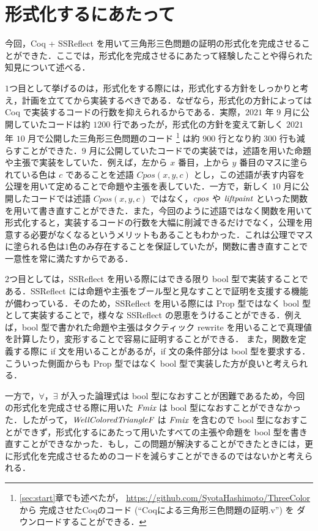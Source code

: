 \section{形式化するにあたって}
今回，Coq + SSReflect を用いて三角形三色問題の証明の形式化を完成させることができた．ここでは，形式化を完成させるにあたって経験したことや得られた知見について述べる．

$1$つ目として挙げるのは，形式化をする際には，形式化する方針をしっかりと考え，計画を立ててから実装するべきである．なぜなら，形式化の方針によっては Coq で実装するコードの行数を抑えられるからである．実際，$2021$ 年 $9$ 月に公開していたコードは約 $1200$ 行であったが，形式化の方針を変えて新しく $2021$ 年 $10$ 月で公開した三角形三色問題のコード
\footnote{
  \ref{sec:start}章でも述べたが，
  \url{https://github.com/SyotaHashimoto/ThreeColor} から
  完成させたCoqのコード (``Coqによる三角形三色問題の証明.v'') を
  ダウンロードすることができる．
}
は約 $900$ 行となり約 $300$ 行も減らすことができた．$9$ 月に公開していたコードでの実装では，述語を用いた命題や主張で実装をしていた．例えば，左から $x$ 番目，上から $y$ 番目のマスに塗られている色は $c$ であることを述語 $Cpos(x,y,c)$ とし，この述語が表す内容を公理を用いて定めることで命題や主張を表していた．一方で，新しく $10$ 月に公開したコードでは述語 $Cpos(x,y,c)$ ではなく，$\textit{cpos}$ や $\textit{liftpaint}$ といった関数を用いて書き直すことができた．また，今回のように述語ではなく関数を用いて形式化すると，実装するコードの行数を大幅に削減できるだけでなく，公理を用意する必要がなくなるというメリットもあることもわかった．これは公理でマスに塗られる色は$1$色のみ存在することを保証していたが，関数に書き直すことで一意性を常に満たすからである．

$2$つ目としては，SSReflect を用いる際にはできる限り bool 型で実装することである．SSReflect には命題や主張をブール型と見なすことで証明を支援する機能が備わっている．そのため，SSReflect を用いる際には Prop 型ではなく bool 型として実装することで，様々な SSReflect の恩恵をうけることができる．例えば，bool 型で書かれた命題や主張はタクティック rewrite を用いることで真理値を計算したり，変形することで容易に証明することができる．
また，関数を定義する際に if 文を用いることがあるが，if 文の条件部分は bool 型を要求する．こういった側面からも Prop 型ではなく bool 型で実装した方が良いと考えられる．

一方で，$\forall$，$\exists$ が入った論理式は bool 型になおすことが困難であるため，今回の形式化を完成させる際に用いた $\textit{Fmix}$ は bool 型になおすことができなかった．したがって，$\textit{WellColoredTriangleF}$ は $\textit{Fmix}$ を含むので bool 型になおすことができず，形式化するにあたって用いたすべての主張や命題を bool 型を書き直すことができなかった．もし，この問題が解決することができたときには，更に形式化を完成させるためのコードを減らすことができるのではないかと考えられる．




